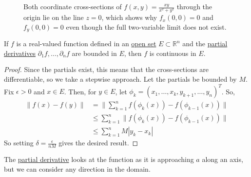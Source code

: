 \begin{example}
\begin{figure}[H]
			\caption{Both coordinate cross-sections of $f(x,y)=\frac{xy}{x^2+y^2}$ through the origin lie on the line $z=0$, which shows why $f_x(0,0)=0$ and $f_y(0,0)=0$ even though the full two-variable limit does not exist.}
		\end{figure}
	\end{example}

	\begin{theorem}
		\label{thm:bounded_partials_continuous}
		If $f$ is a real-valued function defined in an \hyperref[pst-def:open-set]{open set} $E\subset\mathbb{R}^n$ and the \hyperref[def:partial-derivative]{partial derivatives} $\partial_{1} f,\ldots, \partial_{n} f$ are bounded in $E$, then $f$ is continuous in $E$.
	\end{theorem}
	\begin{proof}
		Since the partials exist, this means that the cross-sections are differentiable, so we take a stepwise approach. Let the partials be bounded by $M$. Fix $\epsilon > 0$ and $x \in E$. Then, for $y \in E$, let $\phi_k = (x_1, \ldots, x_k, y_{k+1}, \ldots, y_n)^T$. So, 
		\begin{align}
			\|f(x) - f(y) \| & = \bigg\| \sum_{k=1}^n f(\phi_k (x)) - f(\phi_{k-1} (x)) \bigg\|  \\ 
											 & \leq \sum_{k=1}^n \| f(\phi_k (x)) - f(\phi_{k-1}(x))\| \\ 
											 & \leq \sum_{k=1}^n M |y_k - x_k| 
		\end{align}
		So setting $\delta = \frac{\epsilon}{n M}$ gives the desired result. 
	\end{proof}

	The \hyperref[def:partial-derivative]{partial derivative} looks at the function as it is approaching $a$ along an axis, but we can consider any direction in the domain. 

